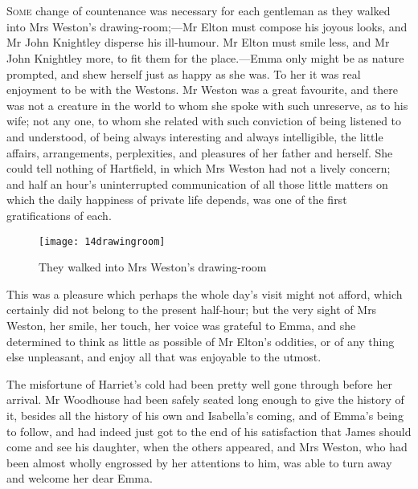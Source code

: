 \chapter[Chapter \thechapter]{}
\lettrine[lines=4,lraise=0.3]{S}{ome} change of countenance was necessary for each gentleman as they walked into Mrs Weston's drawing-room;—Mr Elton must compose his joyous looks, and Mr John Knightley disperse his ill-humour. Mr Elton must smile less, and Mr John Knightley more, to fit them for the place.—Emma only might be as nature prompted, and shew herself just as happy as she was. To her it was real enjoyment to be with the Westons. Mr Weston was a great favourite, and there was not a creature in the world to whom she spoke with such unreserve, as to his wife; not any one, to whom she related with such conviction of being listened to and understood, of being always interesting and always intelligible, the little affairs, arrangements, perplexities, and pleasures of her father and herself. She could tell nothing of Hartfield, in which Mrs Weston had not a lively concern; and half an hour's uninterrupted communication of all those little matters on which the daily happiness of private life depends, was one of the first gratifications of each.

\begin{figure}[tbph]
\centering
\texttt{[image: 14drawingroom]}
\caption{They walked into Mrs Weston's drawing-room}
\end{figure}

This was a pleasure which perhaps the whole day's visit might not afford, which certainly did not belong to the present half-hour; but the very sight of Mrs Weston, her smile, her touch, her voice was grateful to Emma, and she determined to think as little as possible of Mr Elton's oddities, or of any thing else unpleasant, and enjoy all that was enjoyable to the utmost.

The misfortune of Harriet's cold had been pretty well gone through before her arrival. Mr Woodhouse had been safely seated long enough to give the history of it, besides all the history of his own and Isabella's coming, and of Emma's being to follow, and had indeed just got to the end of his satisfaction that James should come and see his daughter, when the others appeared, and Mrs Weston, who had been almost wholly engrossed by her attentions to him, was able to turn away and welcome her dear Emma.

